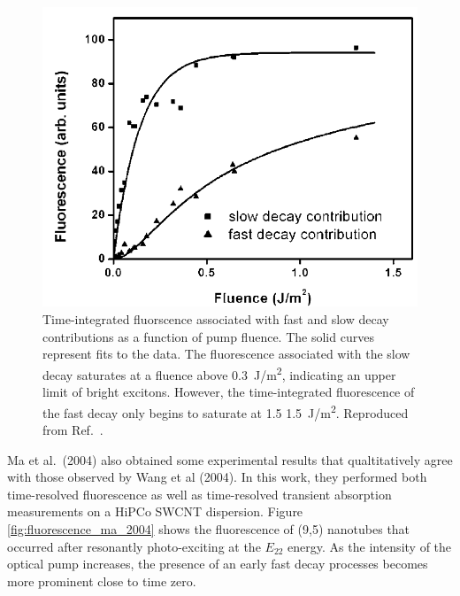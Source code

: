 \begin{figure}[ht]
	\centering
	\includegraphics[scale=0.3]{images/chapter_prior_works/fast_slow_wang_2004}
	\caption{Time-integrated fluorscence associated with fast and slow decay contributions as a function of pump fluence. The solid curves represent fits to the data. The fluorescence associated with the slow decay saturates at a fluence above \SI{0.3}{\joule / \meter \squared}, indicating an upper limit of bright excitons. However, the time-integrated fluorescence of the fast decay only begins to saturate at 1.5  \SI{1.5}{\joule / \meter \squared}. Reproduced from Ref.\ \cite{wang2004observation}.}
	\label{fig:fast_slow_wang_2004}
\end{figure}

Ma et al.\ (2004) also obtained some experimental results that qualtitatively agree with those observed by Wang et al (2004). In this work, they performed both time-resolved fluorescence as well as time-resolved transient absorption measurements on a HiPCo SWCNT dispersion. Figure \ref{fig:fluorescence_ma_2004} shows the fluorescence of (9,5) nanotubes that occurred after resonantly photo-exciting at the $E_{22}$ energy. As the intensity of the optical pump increases, the presence of an early fast decay processes becomes more prominent close to time zero.
%

